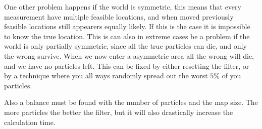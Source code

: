 One other problem happens if the world is symmetric, this means that every measurement have multiple feasible locations, and when moved previously feasible locations still appearers equally likely. If this is the case it is impossible to know the true location. This is can also in extreme cases be a problem if the world is only partially symmetric, since all the true particles can die, and only the wrong survive. When we now enter a asymmetric area all the wrong will die, and we have no particles left. This can be fixed by either resetting the filter, or by a technique where you all ways randomly spread out the worst $5\%$ of you particles. 

Also a balance must be found with the number of particles and the map size. The more particles the better the filter, but it will also drastically increase the calculation time. 

